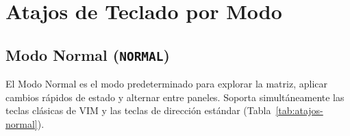 \documentclass[11pt,a4paper]{article}
\begin{document}
\section{Atajos de Teclado por Modo}
\label{sec:teclado}

\subsection{Modo Normal (\texttt{NORMAL})}
El Modo Normal es el modo predeterminado para explorar la matriz, aplicar cambios rápidos de estado y alternar entre paneles. Soporta simultáneamente las teclas clásicas de VIM y las teclas de dirección estándar (Tabla~\ref{tab:atajos-normal}).
\end{document}

